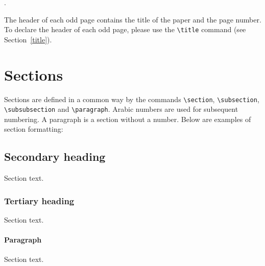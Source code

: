 \documentclass{amcs}
\begin{document}
\medskip{}.

\medskip The header of each odd page contains the title of the paper and the page number. To declare the header of each odd page, please use the {\small \verb+\title+} command (see Section~\ref{title}).

\section{Sections}
Sections are defined in a common way by the commands \verb+\section+, \verb+\subsection+, \verb+\subsubsection+ and \verb+\paragraph+. Arabic numbers are used for subsequent numbering. A paragraph is a section without a number. Below are examples of section formatting:

\subsection{Secondary heading} Section text.
\subsubsection{Tertiary heading} Section text.
\paragraph{Paragraph} Section text.
\end{document}
